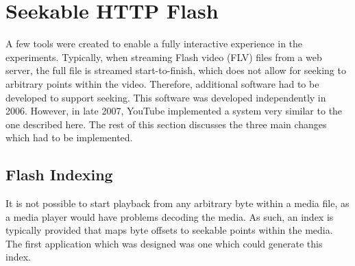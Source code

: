 \section{Seekable HTTP Flash}
\label{sect:seekable_flash}

%
%
%


A few tools were created to enable a fully interactive experience in the experiments. Typically, when streaming Flash video (FLV) files from a web server, the full file is streamed start-to-finish, which does not allow for seeking to arbitrary points within the video. Therefore, additional software had to be developed to support seeking. This software was developed independently in 2006. However, in late 2007, YouTube implemented a system very similar to the one described here. The rest of this section discusses the three main changes which had to be implemented.

\subsection{Flash Indexing}

    It is not possible to start playback from any arbitrary byte within a media file, as a media player would have problems decoding the media. As such, an index is typically provided that maps byte offsets to seekable points within the media. The first application which was designed was one which could generate this index.

